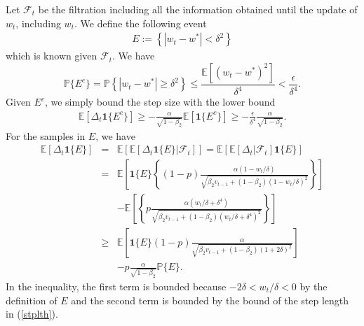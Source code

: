 \documentclass[twoside]{article}
\def\EE{\mathbb{E}}
\def\PP{\mathbb{P}}
\def\FF{\mathcal{F}}
\begin{document}
Let $\FF_t$ be the filtration including all the information obtained until the update of $w_t$, including $w_t$. We define the following event
\begin{eqnarray}
E := \left\{|w_t - w^*|< \delta^2 \right\}\nonumber
\end{eqnarray}
which is known given $\FF_t$. We have
$$\PP\{E^c\} = \PP\left\{ |w_t-w^*|\geq\delta^2\right\} \leq\frac{\EE\left[(w_t-w^*)^2\right]}{\delta^4} < \frac{\epsilon}{\delta^4}.$$
Given $E^c$, we simply bound the step size with the lower bound
\begin{eqnarray}
\EE\left[ \Delta_t \mathbf{1}\{E^c\}\right] \geq -\frac{\alpha}{\sqrt{1-\beta_2}} \EE\left[ \mathbf{1}\{E^c\}\right] \geq -\frac{\epsilon}{\delta^4}\frac{\alpha}{\sqrt{1-\beta_2}}.\nonumber
\end{eqnarray}
For the samples in $E$, we have
\begin{eqnarray}
\EE\left[ \Delta_t \mathbf{1}\{E\}\right] &=& \EE\left[\EE\left[\Delta_t \mathbf{1}\{E\} \left|\FF_t\right.\right]\right] 
=  \EE\left[\EE\left[\Delta_t  \left|\FF_t\right.\right]\mathbf{1}\{E\}\right] \nonumber\\
&=& \EE\left[ \mathbf{1}\{E\} \left\{ (1-p) \frac{\alpha(1-w_t/\delta) }{\sqrt{\beta_2 v_{t-1} + (1-\beta_2) (1-w_t/\delta)^2}}\right\}\right]\nonumber\\
&&- \EE\left[ \left\{ p \frac{\alpha(w_t/\delta + \delta^4)}{\sqrt{\beta_2 v_{t-1} +(1-\beta_2) (w_t/\delta+\delta^4)^2}}\right\}\right]\nonumber\\
&\geq &\EE \left[\mathbf{1}\{E\} (1-p)\frac{\alpha}{\sqrt{\beta_2 v_{t-1} + (1-\beta_2)(1+2\delta)^2}}\right] \nonumber\\
&&- p \frac{\alpha}{\sqrt{1-\beta_2}}\PP\{E\} .\label{Eq3}
\end{eqnarray}
In the inequality, the first term is bounded because $-2\delta<w_t/\delta<0$ by the definition of $E$ and the second term is bounded by the bound of the step length in (\ref{stplth}). 
\end{document}

